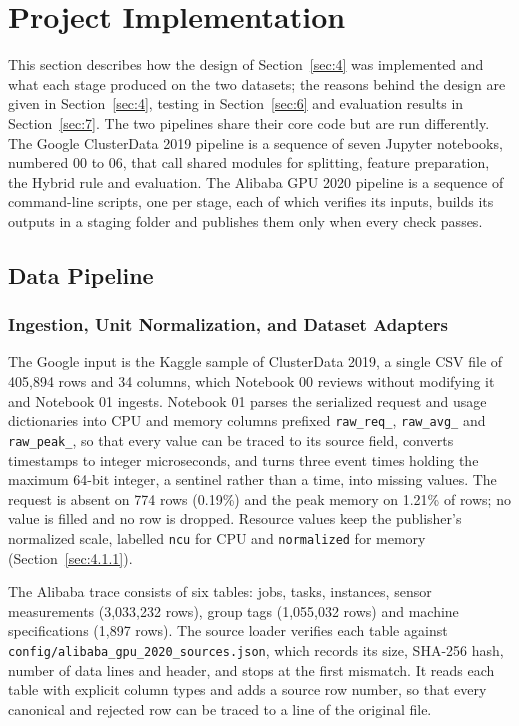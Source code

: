 \documentclass{IEEEtran}
\begin{document}
\section{Project Implementation}\label{sec:5}

This section describes how the design of Section~\ref{sec:4} was implemented and what each stage produced on the two datasets; the reasons behind the design are given in Section~\ref{sec:4}, testing in Section~\ref{sec:6} and evaluation results in Section~\ref{sec:7}. The two pipelines share their core code but are run differently. The Google ClusterData 2019 pipeline \cite{ref7} is a sequence of seven Jupyter notebooks, numbered 00 to 06, that call shared modules for splitting, feature preparation, the Hybrid rule and evaluation. The Alibaba GPU 2020 pipeline \cite{ref19} is a sequence of command-line scripts, one per stage, each of which verifies its inputs, builds its outputs in a staging folder and publishes them only when every check passes.

\subsection{Data Pipeline}\label{sec:5.1}

\subsubsection{Ingestion, Unit Normalization, and Dataset Adapters}\label{sec:5.1.1}

The Google input is the Kaggle sample of ClusterData 2019, a single CSV file of 405,894 rows and 34 columns, which Notebook 00 reviews without modifying it and Notebook 01 ingests. Notebook 01 parses the serialized request and usage dictionaries into CPU and memory columns prefixed \texttt{raw\_req\_}, \texttt{raw\_avg\_} and \texttt{raw\_peak\_}, so that every value can be traced to its source field, converts timestamps to integer microseconds, and turns three event times holding the maximum 64-bit integer, a sentinel rather than a time, into missing values. The request is absent on 774 rows (0.19\%) and the peak memory on 1.21\% of rows; no value is filled and no row is dropped. Resource values keep the publisher's normalized scale, labelled \texttt{ncu} for CPU and \texttt{normalized} for memory (Section~\ref{sec:4.1.1}).

The Alibaba trace consists of six tables: jobs, tasks, instances, sensor measurements (3,033,232 rows), group tags (1,055,032 rows) and machine specifications (1,897 rows). The source loader verifies each table against \texttt{config/alibaba\_gpu\_2020\_sources.json}, which records its size, SHA-256 hash, number of data lines and header, and stops at the first mismatch. It reads each table with explicit column types and adds a source row number, so that every canonical and rejected row can be traced to a line of the original file.
\end{document}
